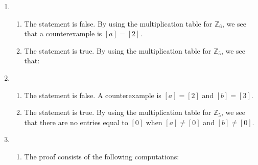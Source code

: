\begin{enumerate}
\item \begin{enumerate}
\item The statement is false.  By using the multiplication table for $\mathbb{Z}_6$, we see that a counterexample is $\left[ a \right] = \left[ 2 \right]$.

\item The statement is true.  By using the multiplication table for $\mathbb{Z}_5$, we see that:

\begin{multicols}{2}
\end{multicols}
\end{enumerate}



\item \begin{enumerate}
\item The statement is false.  A counterexample is $\left[ a \right] = \left[ 2 \right]$ and $\left[ b \right] = \left[ 3 \right]$.

\item The statement is true.  By using the multiplication table for $\mathbb{Z}_5$, we see that there are no entries equal to $\left[ 0 \right]$ when $\left[ a \right] \ne \left[ 0 \right]$ and 
$\left[ b \right] \ne \left[ 0 \right]$.
\end{enumerate}



\item \begin{enumerate}
\item The proof consists of the following computations:
\begin{multicols}{2}
\end{multicols}


\end{enumerate}
\end{enumerate}
